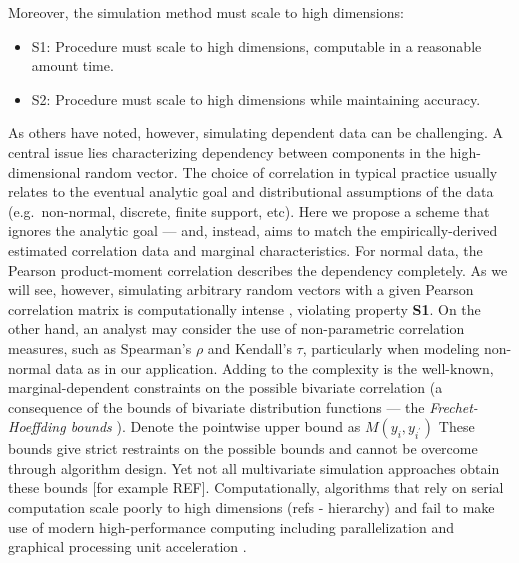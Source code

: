 \documentclass[
]{article}
\providecommand{\tightlist}{%
  \setlength{\itemsep}{0pt}\setlength{\parskip}{0pt}}
\begin{document}
Moreover, the simulation method must scale to high dimensions:

\begin{itemize}
\tightlist
\item
  S1: Procedure must scale to high dimensions, computable in a reasonable amount time.
\item
  S2: Procedure must scale to high dimensions while maintaining accuracy.
\end{itemize}

As others \citet{MB13} have noted, however, simulating dependent data can be challenging. A central issue lies characterizing dependency between components in the high-dimensional random vector. The choice of correlation in typical practice usually relates to the eventual analytic goal and distributional assumptions of the data (e.g.~non-normal, discrete, finite support, etc). Here we propose a scheme that ignores the analytic goal --- and, instead, aims to match the empirically-derived estimated correlation data and marginal characteristics. For normal data, the Pearson product-moment correlation describes the dependency completely. As we will see, however, simulating arbitrary random vectors with a given Pearson correlation matrix is computationally intense \citep[\citet{Xia17}]{Chen2001}, violating property \textbf{S1}. On the other hand, an analyst may consider the use of non-parametric correlation measures, such as Spearman's \(\rho\) and Kendall's \(\tau\), particularly when modeling non-normal data as in our application. Adding to the complexity is the well-known, marginal-dependent constraints on the possible bivariate correlation (a consequence of the bounds of bivariate distribution functions --- the \emph{Frechet-Hoeffding bounds} \citep{Nelsen2007}). Denote the pointwise upper bound as \(M(y_i, y_{i^\prime})\) These bounds give strict restraints on the possible bounds and cannot be overcome through algorithm design. Yet not all multivariate simulation approaches obtain these bounds {[}for example REF{]}. Computationally, algorithms that rely on serial computation scale poorly to high dimensions (refs - hierarchy) and fail to make use of modern high-performance computing including parallelization and graphical processing unit acceleration \citep{Li2019gpu}.
\end{document}
